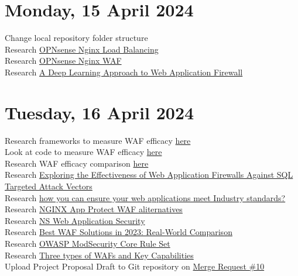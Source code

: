 \section[2024/04/15]{Monday, 15 April 2024}
Change local repository folder structure\\
Research \href{https://docs.opnsense.org/manual/how-tos/nginx.html}{OPNsense Nginx Load Balancing}\\
Research \href{https://docs.opnsense.org/manual/how-tos/nginx_waf.html#background-information}{OPNsense Nginx WAF}\\
Research \href{https://medium.com/@tarcisioma/a-deep-learning-approach-to-web-application-firewall-c6190a9bd31a}{A Deep Learning Approach to Web Application Firewall}\\
\pendsign

\section[2024/04/16]{Tuesday, 16 April 2024}
Research frameworks to measure WAF efficacy \href{https://www.fastly.com/blog/the-waf-efficacy-framework-measuring-the-effectiveness-of-your-waf#:~:text=Based%20on%20the%20calculation%20of,protection%20against%20SQL%20Injection%20attacks.}{here}\\
Look at code to measure WAF efficacy \href{https://github.com/fastly/wafefficacy}{here}\\
Research WAF efficacy comparison \href{http://projects.webappsec.org/w/page/13246985/Web%20Application%20Firewall%20Evaluation%20Criteria}{here}\\
Research \href{https://ieeexplore.ieee.org/abstract/document/10395379/}{Exploring the Effectiveness of Web Application Firewalls Against SQL Targeted Attack Vectors}\\
Research \href{https://www.linkedin.com/advice/0/how-can-you-ensure-your-web-applications-meet}{how you can ensure your web applications meet Industry standards?}\\
Research \href{https://www.gartner.com/reviews/market/cloud-web-application-and-api-protection/vendor/f5/product/nginx-app-protect-waf/alternatives}{NGINX App Protect WAF aliternatives}\\
Research \href{https://nssoft.co.uk/web-app/}{NS Web Application Security}\\
Research \href{https://www.openappsec.io/post/best-waf-solutions-in-2023-real-world-comparison}{Best WAF Solutions in 2023: Real-World Comparison}\\
Research \href{https://owasp.org/www-project-modsecurity-core-rule-set/}{OWASP ModSecurity Core Rule Set}\\
Research \href{https://www.hackerone.com/knowledge-center/web-application-firewall}{Three types of WAFs and Key Capabilities}\\
Upload Project Proposal Draft to Git repository on \href{https://repo.ee.up.ac.za/eece_ugfyp_tg/2024_isg/tg4-koot-u20426471/-/merge_requests/10}{Merge Request \#10}\\
\pendsign

